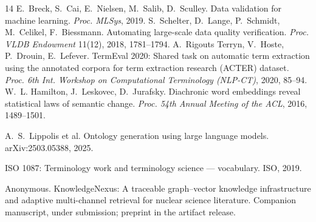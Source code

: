 \documentclass[sigconf,nonacm,anonymous]{acmart}
\begin{document}
\begin{thebibliography}{14}
 E.~Breck, S.~Cai, E.~Nielsen, M.~Salib, D.~Sculley. Data
validation for machine learning. \textit{Proc. MLSys}, 2019.
 S.~Schelter, D.~Lange, P.~Schmidt, M.~Celikel,
F.~Biessmann. Automating large-scale data quality verification.
\textit{Proc. VLDB Endowment} 11(12), 2018, 1781--1794.
 A.~Rigouts Terryn, V.~Hoste, P.~Drouin, E.~Lefever.
TermEval 2020: Shared task on automatic term extraction using the
annotated corpora for term extraction research (ACTER) dataset.
\textit{Proc. 6th Int. Workshop on Computational Terminology (NLP-CT)},
2020, 85--94.
 W.~L. Hamilton, J.~Leskovec, D.~Jurafsky.
Diachronic word embeddings reveal statistical laws of semantic change.
\textit{Proc. 54th Annual Meeting of the ACL}, 2016, 1489--1501.

 A.~S.~Lippolis et al. Ontology generation using large
language models. arXiv:2503.05388, 2025.

 ISO 1087: Terminology work and terminology science ---
vocabulary. ISO, 2019.

 Anonymous. KnowledgeNexus: A traceable graph--vector
knowledge infrastructure and adaptive multi-channel retrieval for nuclear
science literature. Companion manuscript, under submission; preprint in
the artifact release.

\end{thebibliography}
\end{document}

